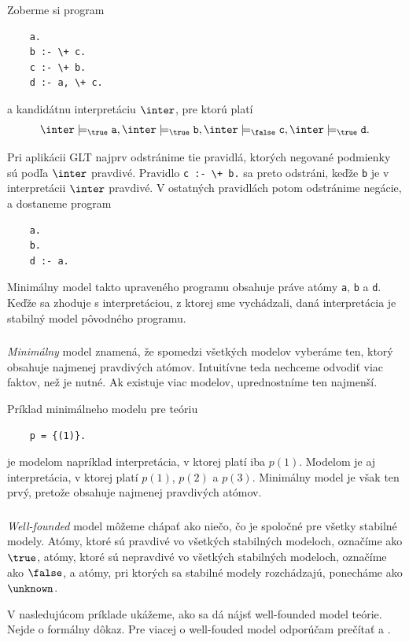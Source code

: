 Zoberme si program
\begin{verbatim}
    a.
    b :- \+ c.
    c :- \+ b.
    d :- a, \+ c.
\end{verbatim}

a kandidátnu interpretáciu $\inter$, pre ktorú platí
$$\inter \models_\true \verb|a|, \inter \models_\true \verb|b|, \inter \models_\false \verb|c|,
\inter \models_\true \verb|d|\text{.}$$

Pri aplikácii GLT najprv odstránime tie pravidlá, ktorých negované podmienky sú podľa $\inter$
pravdivé. Pravidlo \verb|c :- \+ b.| sa preto odstráni, keďže \verb|b| je v interpretácii $\inter$
pravdivé. V ostatných pravidlách potom odstránime negácie, a dostaneme program
\begin{verbatim}
    a.
    b.
    d :- a.
\end{verbatim}

Minimálny model takto upraveného programu obsahuje práve atómy \verb|a|, \verb|b| a \verb|d|. Keďže
sa zhoduje s interpretáciou, z ktorej sme vychádzali, daná interpretácia je stabilný model pôvodného
programu.

\subsubsection{}
\textit{Minimálny} model znamená, že spomedzi všetkých modelov vyberáme ten, ktorý obsahuje najmenej
pravdivých atómov. Intuitívne teda nechceme odvodiť viac faktov, než je nutné. Ak existuje viac
modelov, uprednostníme ten najmenší.

Príklad minimálneho modelu pre teóriu
\begin{verbatim}
    p = {(1)}.
\end{verbatim}
je modelom napríklad interpretácia, v ktorej platí iba $p(1)$. Modelom je aj interpretácia, v ktorej
platí $p(1)$, $p(2)$ a $p(3)$. Minimálny model je však ten prvý, pretože obsahuje najmenej
pravdivých atómov.

\subsubsection{}
\textit{Well-founded} model môžeme chápať ako niečo, čo je spoločné pre všetky stabilné modely.
Atómy, ktoré sú pravdivé vo všetkých stabilných modeloch, označíme ako $\true$, atómy, ktoré sú
nepravdivé vo všetkých stabilných modeloch, označíme ako $\false$, a atómy, pri ktorých sa stabilné
modely rozchádzajú, ponecháme ako $\unknown$.

V nasledujúcom príklade ukážeme, ako sa dá nájsť well-founded model teórie. Nejde o formálny dôkaz.
Pre viacej o well-fouded model odporúčam prečítať \cite{WellFounded} a \cite{SemanticsQueries}. 

